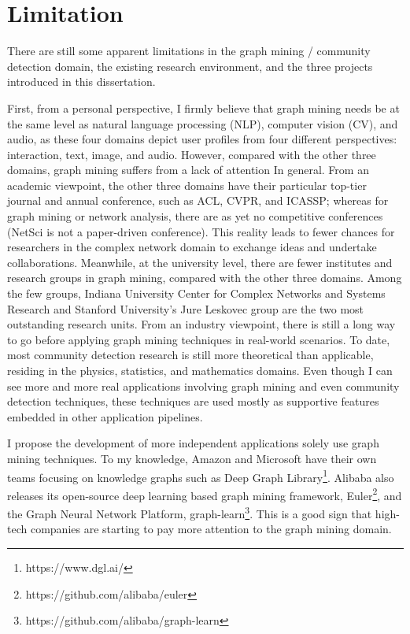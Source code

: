 \section{Limitation}

There are still some apparent limitations in the graph mining / community detection domain, the existing research environment, and the three projects introduced in this dissertation.

First, from a personal perspective, I firmly believe that graph mining needs be at the same level as natural language processing (NLP), computer vision (CV), and audio, as these four domains depict user profiles from four different perspectives: interaction, text, image, and audio. However, compared with the other three domains, graph mining suffers from a lack of attention In general. From an academic viewpoint, the other three domains have their particular top-tier journal and annual conference, such as ACL, CVPR, and ICASSP;  whereas for graph mining or network analysis, there are as yet no competitive conferences (NetSci is not a paper-driven conference). This reality leads to fewer chances for researchers in the complex network domain to exchange ideas and undertake collaborations. Meanwhile, at the university level, there are fewer institutes and research groups in graph mining, compared with the other three domains. Among the few groups, Indiana University Center for Complex Networks and Systems Research and Stanford University's Jure Leskovec group are the two most outstanding research units. From an industry viewpoint, there is still a long way to go before applying graph mining techniques in real-world scenarios. To date, most community detection research is still more theoretical than applicable, residing in the physics, statistics, and mathematics domains. Even though I can see more and more real applications involving graph mining and even community detection techniques, these techniques are used mostly as supportive features embedded in other application pipelines.

I propose the development of more independent applications solely use graph mining techniques. To my knowledge, Amazon and Microsoft have their own teams focusing on knowledge graphs such as Deep Graph Library\footnote{https://www.dgl.ai/}. Alibaba also releases its open-source deep learning based graph mining framework, Euler\footnote{https://github.com/alibaba/euler}, and the Graph Neural Network Platform, graph-learn\footnote{https://github.com/alibaba/graph-learn}. This is a good sign that high-tech companies are starting to pay more attention to the graph mining domain. 


